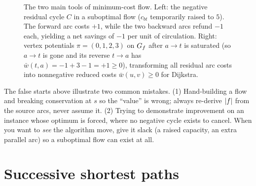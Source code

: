 \begin{figure}[H]
\caption{The two main tools of minimum-cost flow. Left: the negative residual cycle $C$ in a suboptimal flow ($c_{bt}$ temporarily raised to $5$). The forward arc costs $+1$, while the two backward arcs refund $-1$ each, yielding a net savings of $-1$ per unit of circulation. Right: vertex potentials $\pi=(0,1,2,3)$ on $G_f$ after $a\!\to\!t$ is saturated (so $a\!\to\!t$ is gone and its reverse $t\!\to\!a$ has $\bar w(t,a)=-1+3-1=+1\ge 0$), transforming all residual arc costs into nonnegative reduced costs $\bar w(u,v) \ge 0$ for Dijkstra.}
\label{ch14:fig-residual}
\end{figure}

\begin{trapbox}
The false starts above illustrate two common mistakes. (1) Hand-building a flow and breaking conservation at $s$ so the ``value'' is wrong; always re-derive $\lvert f\rvert$ from the source arcs, never assume it. (2) Trying to demonstrate improvement on an instance whose optimum is forced, where no negative cycle exists to cancel. When you want to \emph{see} the algorithm move, give it slack (a raised capacity, an extra parallel arc) so a suboptimal flow can exist at all.
\end{trapbox}

\section{Successive shortest paths}
\label{ch14:ssp}

